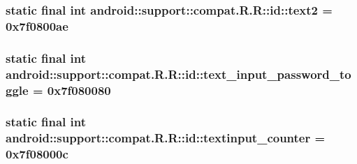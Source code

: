 \hypertarget{classandroid_1_1support_1_1compat_1_1_r_1_1id_f42d3cb20a0271b00299059d3b90bd1c}{
\subsubsection[{text2}]{\setlength{\rightskip}{0pt plus 5cm}static final int android::support::compat.R.R::id::text2 = 0x7f0800ae}}
\label{classandroid_1_1support_1_1compat_1_1_r_1_1id_f42d3cb20a0271b00299059d3b90bd1c}


\hypertarget{classandroid_1_1support_1_1compat_1_1_r_1_1id_55cf7f62b3b683a94325b0fc7feee3fe}{
\subsubsection[{text\_\-input\_\-password\_\-toggle}]{\setlength{\rightskip}{0pt plus 5cm}static final int android::support::compat.R.R::id::text\_\-input\_\-password\_\-toggle = 0x7f080080}}
\label{classandroid_1_1support_1_1compat_1_1_r_1_1id_55cf7f62b3b683a94325b0fc7feee3fe}


\hypertarget{classandroid_1_1support_1_1compat_1_1_r_1_1id_1642a95598d2cff230ce902d4a62e6dc}{
\subsubsection[{textinput\_\-counter}]{\setlength{\rightskip}{0pt plus 5cm}static final int android::support::compat.R.R::id::textinput\_\-counter = 0x7f08000c}}
\label{classandroid_1_1support_1_1compat_1_1_r_1_1id_1642a95598d2cff230ce902d4a62e6dc}


